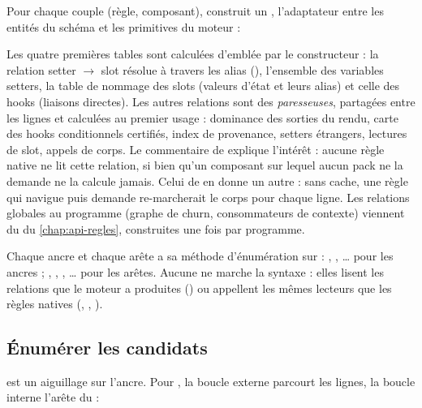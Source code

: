 Pour chaque couple (règle, composant),  construit un , l'adaptateur entre les entités du schéma et les primitives du moteur :


Les quatre premières tables sont calculées d'emblée par le constructeur : la relation setter $\to$ slot résolue à travers les alias (), l'ensemble des variables setters, la table de nommage des slots (valeurs d'état et leurs alias) et celle des hooks (liaisons directes). Les autres relations sont des  \emph{paresseuses}, partagées entre les lignes et calculées au premier usage : dominance des sorties du rendu, carte des hooks conditionnels certifiés, index de provenance, setters étrangers, lectures de slot, appels de corps. Le commentaire de  explique l'intérêt : aucune règle native ne lit cette relation, si bien qu'un composant sur lequel aucun pack ne la demande ne la calcule jamais. Celui de  en donne un autre : sans cache, une règle qui navigue  puis demande  re-marcherait le corps pour chaque ligne. Les relations globales au programme (graphe de churn, consommateurs de contexte) viennent du  du \cref{chap:api-regles}, construites une fois par programme.

Chaque ancre et chaque arête a sa méthode d'énumération sur  : , , \ldots{} pour les ancres ; , , , \ldots{} pour les arêtes. Aucune ne marche la syntaxe : elles lisent les relations que le moteur a produites () ou appellent les mêmes lecteurs que les règles natives (, , ).

\subsection{Énumérer les candidats}

 est un aiguillage sur l'ancre. Pour , la boucle externe parcourt les lignes, la boucle interne l'arête du  :


